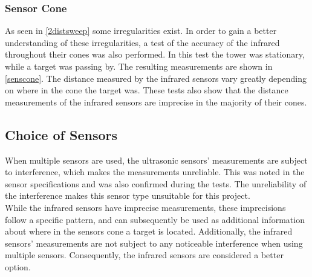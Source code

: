\subsubsection{Sensor Cone}\label{cone}
As seen in \cref{2distsweep} some irregularities exist. In order to gain a better understanding of these irregularities, a test of the accuracy of the infrared throughout their cones was also performed. In this test the tower was stationary, while a target was passing by. The resulting measurements are shown in \cref{senscone}. The distance measured by the infrared sensors vary greatly depending on where in the cone the target was. These tests also show that the distance measurements of the infrared sensors are imprecise in the majority of their cones. 



\subsection{Choice of Sensors}\label{bestchoice}
When multiple sensors are used, the ultrasonic sensors' measurements are subject to interference, which makes the measurements unreliable. This was noted in the sensor specifications and was also confirmed during the tests. The unreliability of the interference makes this sensor type unsuitable for this project.  \\

While the infrared sensors have imprecise measurements, these imprecisions follow a specific pattern, and can subsequently be used as additional information about where in the sensors cone a target is located. Additionally, the infrared sensors' measurements are not subject to any noticeable interference when using multiple sensors. Consequently, the infrared sensors are considered a better option.










